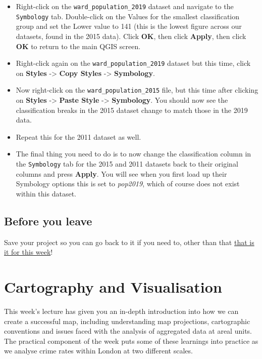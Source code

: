 \documentclass[
]{book}
\providecommand{\tightlist}{%
  \setlength{\itemsep}{0pt}\setlength{\parskip}{0pt}}
\begin{document}
\begin{itemize}
\tightlist
\item
  Right-click on the \texttt{ward\_population\_2019} dataset and navigate to the \texttt{Symbology} tab. Double-click on the Values for the smallest classification group and set the Lower value to 141 (this is the lowest figure across our datasets, found in the 2015 data). Click \textbf{OK}, then click \textbf{Apply}, then click \textbf{OK} to return to the main QGIS screen.
\item
  Right-click again on the \texttt{ward\_population\_2019} dataset but this time, click on \textbf{Styles} -\textgreater{} \textbf{Copy Styles} -\textgreater{} \textbf{Symbology}.
\item
  Now right-click on the \texttt{ward\_population\_2015} file, but this time after clicking on \textbf{Styles} -\textgreater{} \textbf{Paste Style} -\textgreater{} \textbf{Symbology}. You should now see the classification breaks in the 2015 dataset change to match those in the 2019 data.
\item
  Repeat this for the 2011 dataset as well.
\item
  The final thing you need to do is to now change the classification column in the \texttt{Symbology} tab for the 2015 and 2011 datasets back to their original columns and press \textbf{Apply}. You will see when you first load up their Symbology options this is set to \emph{pop2019}, which of course does not exist within this dataset.
\end{itemize}

\hypertarget{byl-w02}{%
\section{Before you leave}\label{byl-w02}}

Save your project so you can go back to it if you need to, other than that \href{https://www.youtube.com/watch?v=Wmc8bQoL-J0}{that is it for this week}!

\hypertarget{cartography-and-visualisation}{%
\chapter{Cartography and Visualisation}\label{cartography-and-visualisation}}

This week's lecture has given you an in-depth introduction into how we can create a successful map, including understanding map projections, cartographic conventions and issues faced with the analysis of aggregated data at areal units. The practical component of the week puts some of these learnings into practice as we analyse crime rates within London at two different scales.
\end{document}
